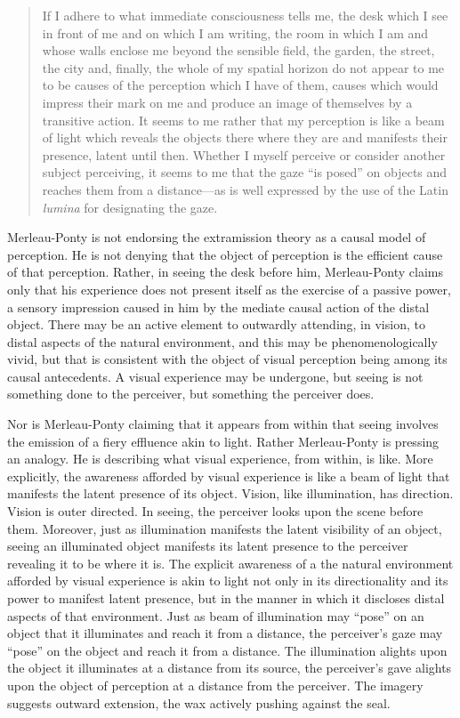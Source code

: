 \begin{quote}
	If I adhere to what immediate consciousness tells me, the desk which I see in front of me and on which I am writing, the room in which I am and whose walls enclose me beyond the sensible field, the garden, the street, the city and, finally, the whole of my spatial horizon do not appear to me to be causes of the perception which I have of them, causes which would impress their mark on me and produce an image of themselves by a transitive action. It seems to me rather that my perception is like a beam of light which reveals the objects there where they are and manifests their presence, latent until then. Whether I myself perceive or consider another subject perceiving, it seems to me that the gaze ``is posed'' on objects and reaches them from a distance---as is well expressed by the use of the Latin \emph{lumina} for designating the gaze. \citep[185]{Merleau-Ponty:1967fj}
\end{quote}
Merleau-Ponty is not endorsing the extramission theory as a causal model of perception. He is not denying that the object of perception is the efficient cause of that perception. Rather, in seeing the desk before him, Merleau-Ponty claims only that his experience does not present itself as the exercise of a passive power, a sensory impression caused in him by the mediate causal action of the distal object. There may be an active element to outwardly attending, in vision, to distal aspects of the natural environment, and this may be phenomenologically vivid, but that is consistent with the object of visual perception being among its causal antecedents. A visual experience may be undergone, but seeing is not something done to the perceiver, but something the perceiver does.

Nor is Merleau-Ponty claiming that it appears from within that seeing involves the emission of a fiery effluence akin to light. Rather Merleau-Ponty is pressing an analogy. He is describing what visual experience, from within, is like. More explicitly, the awareness afforded by visual experience is like a beam of light that manifests the latent presence of its object. Vision, like illumination, has direction. Vision is outer directed. In seeing, the perceiver looks upon the scene before them. Moreover, just as illumination manifests the latent visibility of an object, seeing an illuminated object manifests its latent presence to the perceiver revealing it to be where it is. The explicit awareness of a the natural environment afforded by visual experience is akin to light not only in its directionality and its power to manifest latent presence, but in the manner in which it discloses distal aspects of that environment. Just as beam of illumination may ``pose'' on an object that it illuminates and reach it from a distance, the perceiver's gaze may ``pose'' on the object and reach it from a distance. The illumination alights upon the object it illuminates at a distance from its source, the perceiver's gave alights upon the object of perception at a distance from the perceiver. The imagery suggests outward extension, the wax actively pushing against the seal.

